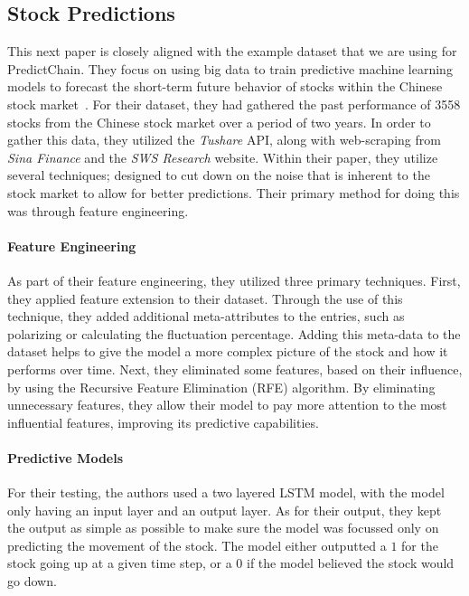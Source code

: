 \documentclass{ledger}
\begin{document}
\subsection{Stock Predictions}

This next paper is closely aligned with the example dataset that we are using for PredictChain.  They focus on
using big data to train predictive machine learning models to forecast the short-term future behavior of stocks
within the Chinese stock market~\cite{deepPrediction}.  For their dataset, they had gathered the past performance of
3558 stocks from the Chinese stock market over a period of two years.  In order to gather this data, they utilized
the \textit{Tushare} API, along with web-scraping from \textit{Sina Finance} and the \textit{SWS Research} website.
Within their paper, they utilize several techniques; designed to cut down on the noise that is inherent to the stock
market to allow for better predictions.  Their primary method for doing this was through feature engineering.

\paragraph{Feature Engineering}
As part of their feature engineering, they utilized three primary techniques.  First, they applied feature extension
to their dataset.  Through the use of this technique, they added additional meta-attributes to the entries, such
as polarizing or calculating the fluctuation percentage.  Adding this meta-data to the dataset helps to give the model
a more complex picture of the stock and how it performs over time.  Next, they eliminated some features, based on their
influence, by using the Recursive Feature Elimination (RFE) algorithm.  By eliminating unnecessary features, they allow
their model to pay more attention to the most influential features, improving its predictive capabilities.

\paragraph{Predictive Models}
For their testing, the authors used a two layered LSTM model, with the model only having an input layer
and an output layer.  As for their output, they kept the output as simple as possible to make sure the model
was focussed only on predicting the movement of the stock.  The model either outputted a $1$ for the stock going up at
a given time step, or a $0$ if the model believed the stock would go down.
\end{document}
